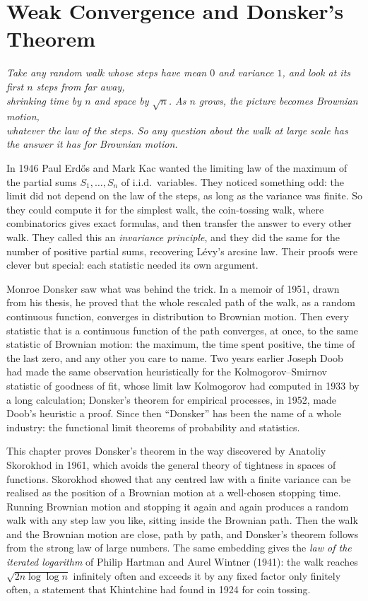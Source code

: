 \chapter{Weak Convergence and Donsker's Theorem}
\begin{center}\itshape
Take any random walk whose steps have mean $0$ and variance $1$, and look at its first $n$ steps from far away,\\
shrinking time by $n$ and space by $\sqrt n$. As $n$ grows, the picture becomes Brownian motion,\\
whatever the law of the steps. So any question about the walk at large scale has the answer it has for Brownian motion.
\end{center}

In 1946 Paul Erd\H{o}s and Mark Kac wanted the limiting law of the maximum of the partial sums $S_1,\dots,S_n$ of i.i.d.\ variables. They
noticed something odd: the limit did not depend on the law of the steps, as long as the variance was finite. So they could compute it for
the simplest walk, the coin-tossing walk, where combinatorics gives exact formulas, and then transfer the answer to every other walk. They
called this an \emph{invariance principle}, and they did the same for the number of positive partial sums, recovering L\'evy's arcsine
law. Their proofs were clever but special: each statistic needed its own argument.

Monroe Donsker saw what was behind the trick. In a memoir of 1951, drawn from his thesis, he proved that the whole rescaled path of the walk, as a random continuous
function, converges in distribution to Brownian motion. Then every statistic that is a continuous function of the path converges, at
once, to the same statistic of Brownian motion: the maximum, the time spent positive, the time of the last zero, and any other you care to
name. Two years earlier Joseph Doob had made the same observation heuristically for the Kolmogorov--Smirnov statistic of goodness of fit,
whose limit law Kolmogorov had computed in 1933 by a long calculation; Donsker's theorem for empirical processes, in 1952, made Doob's
heuristic a proof. Since then ``Donsker'' has been the name of a whole industry: the functional limit theorems of probability and
statistics.

This chapter proves Donsker's theorem in the way discovered by Anatoliy Skorokhod in 1961, which avoids the general theory of tightness in
spaces of functions. Skorokhod showed that any centred law with a finite variance can be realised as the position of a Brownian motion at a
well-chosen stopping time. Running Brownian motion and stopping it again and again produces a random walk with any step law you like, sitting
inside the Brownian path. Then the walk and the Brownian motion are close, path by path, and Donsker's theorem follows from the strong law
of large numbers. The same embedding gives the \emph{law of the iterated logarithm} of Philip Hartman and Aurel Wintner (1941): the walk
reaches $\sqrt{2n\log\log n}$ infinitely often and exceeds it by any fixed factor only finitely often, a statement that Khintchine had found in
1924 for coin tossing.

